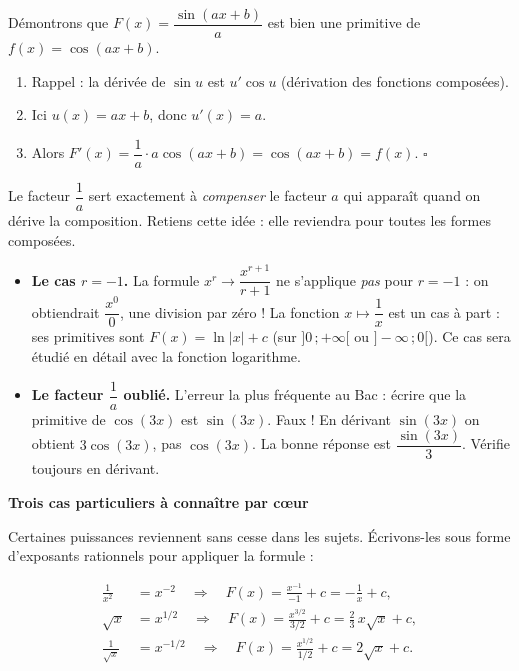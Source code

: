 \documentclass[11pt]{article}
\begin{document}
\begin{experience}
Démontrons que $F(x) = \dfrac{\sin(ax+b)}{a}$ est bien une primitive de $f(x) = \cos(ax+b)$.
\begin{enumerate}
\item Rappel : la dérivée de $\sin u$ est $u' \cos u$ (dérivation des fonctions composées).
\item Ici $u(x) = ax + b$, donc $u'(x) = a$.
\item Alors $F'(x) = \dfrac{1}{a} \cdot a \cos(ax+b) = \cos(ax+b) = f(x)$. \quad $\square$
\end{enumerate}
Le facteur $\dfrac{1}{a}$ sert exactement à \emph{compenser} le facteur $a$ qui apparaît quand on dérive la composition. Retiens cette idée : elle reviendra pour toutes les formes composées.
\end{experience}

\begin{attention}
\begin{itemize}
\item \textbf{Le cas $r = -1$.} La formule $x^r \to \dfrac{x^{r+1}}{r+1}$ ne s'applique \emph{pas} pour $r = -1$ : on obtiendrait $\dfrac{x^0}{0}$, une division par zéro ! La fonction $x \mapsto \dfrac{1}{x}$ est un cas à part : ses primitives sont $F(x) = \ln|x| + c$ (sur $]0\,;+\infty[$ ou $]-\infty\,;0[$). Ce cas sera étudié en détail avec la fonction logarithme.
\item \textbf{Le facteur $\dfrac{1}{a}$ oublié.} L'erreur la plus fréquente au Bac : écrire que la primitive de $\cos(3x)$ est $\sin(3x)$. Faux ! En dérivant $\sin(3x)$ on obtient $3\cos(3x)$, pas $\cos(3x)$. La bonne réponse est $\dfrac{\sin(3x)}{3}$. Vérifie toujours en dérivant.
\end{itemize}
\end{attention}

\textbf{Trois cas particuliers à connaître par cœur}\par

Certaines puissances reviennent sans cesse dans les sujets. Écrivons-les sous forme d'exposants rationnels pour appliquer la formule :

\begin{align*}
\frac{1}{x^2} &= x^{-2} \quad\Longrightarrow\quad F(x) = \frac{x^{-1}}{-1} + c = -\frac{1}{x} + c,\\[2pt]
\sqrt{x} &= x^{1/2} \quad\Longrightarrow\quad F(x) = \frac{x^{3/2}}{3/2} + c = \frac{2}{3}\,x\sqrt{x} + c,\\[2pt]
\frac{1}{\sqrt{x}} &= x^{-1/2} \quad\Longrightarrow\quad F(x) = \frac{x^{1/2}}{1/2} + c = 2\sqrt{x} + c.
\end{align*}
\end{document}
